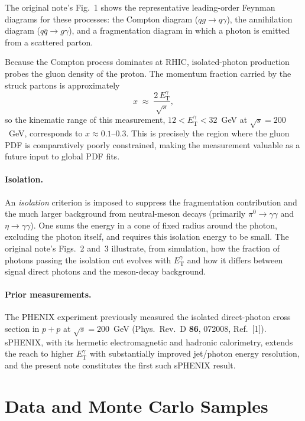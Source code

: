 \documentclass[11pt]{article}
\newcommand{\ETg}{E_{\mathrm{T}}^{\gamma}}
\newcommand{\sqrts}{\sqrt{s}}
\begin{document}
\noindent
The original note's Fig.~1 shows the representative leading-order Feynman
diagrams for these processes: the Compton diagram ($qg\to q\gamma$), the
annihilation diagram ($q\bar q\to g\gamma$), and a fragmentation diagram in
which a photon is emitted from a scattered parton.

Because the Compton process dominates at RHIC, isolated-photon production probes
the gluon density of the proton. The momentum fraction carried by the struck
partons is approximately
\begin{equation}
  x \;\approx\; \frac{2\,\ETg}{\sqrts},
\end{equation}
so the kinematic range of this measurement, $12 < \ETg < 32$~GeV at
$\sqrts = 200$~GeV, corresponds to $x \approx 0.1$--$0.3$. This is precisely the
region where the gluon PDF is comparatively poorly constrained, making the
measurement valuable as a future input to global PDF fits.

\paragraph{Isolation.} An \emph{isolation} criterion is imposed to suppress the
fragmentation contribution and the much larger background from neutral-meson
decays (primarily $\pi^0 \to \gamma\gamma$ and $\eta\to\gamma\gamma$). One sums
the energy in a cone of fixed radius around the photon, excluding the photon
itself, and requires this isolation energy to be small. The original note's
Figs.~2 and~3 illustrate, from simulation, how the fraction of photons passing
the isolation cut evolves with $\ETg$ and how it differs between signal direct
photons and the meson-decay background.

\paragraph{Prior measurements.} The PHENIX experiment previously measured the
isolated direct-photon cross section in $p+p$ at $\sqrts=200$~GeV
(Phys.\ Rev.\ D \textbf{86}, 072008, Ref.~[1]). sPHENIX, with its hermetic
electromagnetic and hadronic calorimetry, extends the reach to higher $\ETg$
with substantially improved jet/photon energy resolution, and the present note
constitutes the first such sPHENIX result.

\section{Data and Monte Carlo Samples}
\end{document}

